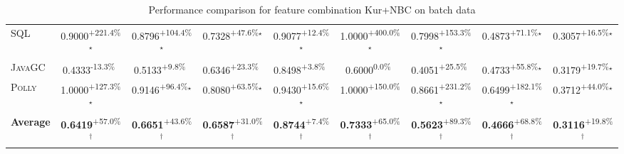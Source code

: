 \begin{table}[htbp]
\begin{tabular}{l|cccc|cccc}
\textsc{SQL} & \cellcolor{green!30}0.9000\textsuperscript{+221.4\%}$^\star$ & \cellcolor{green!30}0.8796\textsuperscript{+104.4\%}$^\star$ & \cellcolor{green!30}0.7328\textsuperscript{+47.6\%}$^\star$ & \cellcolor{green!30}0.9077\textsuperscript{+12.4\%}$^\star$ & \cellcolor{green!30}1.0000\textsuperscript{+400.0\%}$^\star$ & \cellcolor{green!30}0.7998\textsuperscript{+153.3\%}$^\star$ & \cellcolor{green!30}0.4873\textsuperscript{+71.1\%}$^\star$ & \cellcolor{green!30}0.3057\textsuperscript{+16.5\%}$^\star$ \\
\textsc{JavaGC} & \cellcolor{red!30}0.4333\textsuperscript{-13.3\%}$^{\,\,\,}$ & \cellcolor{green!30}0.5133\textsuperscript{+9.8\%}$^{\,\,\,}$ & \cellcolor{green!30}0.6346\textsuperscript{+23.3\%}$^{\,\,\,}$ & \cellcolor{green!30}0.8498\textsuperscript{+3.8\%}$^{\,\,\,}$ & \cellcolor{red!30}0.6000\textsuperscript{0.0\%}$^{\,\,\,}$ & \cellcolor{green!30}0.4051\textsuperscript{+25.5\%}$^{\,\,\,}$ & \cellcolor{green!30}0.4733\textsuperscript{+55.8\%}$^\star$ & \cellcolor{green!30}0.3179\textsuperscript{+19.7\%}$^\star$ \\
\textsc{Polly} & \cellcolor{green!30}1.0000\textsuperscript{+127.3\%}$^\star$ & \cellcolor{green!30}0.9146\textsuperscript{+96.4\%}$^\star$ & \cellcolor{green!30}0.8080\textsuperscript{+63.5\%}$^\star$ & \cellcolor{green!30}0.9430\textsuperscript{+15.6\%}$^\star$ & \cellcolor{green!30}1.0000\textsuperscript{+150.0\%}$^{\,\,\,}$ & \cellcolor{green!30}0.8661\textsuperscript{+231.2\%}$^\star$ & \cellcolor{green!30}0.6499\textsuperscript{+182.1\%}$^\star$ & \cellcolor{green!30}0.3712\textsuperscript{+44.0\%}$^\star$ \\
\hline
\textbf{Average} & \cellcolor{green!30}\textbf{0.6419}\textsuperscript{+57.0\%}$^\dagger$ & \cellcolor{green!30}\textbf{0.6651}\textsuperscript{+43.6\%}$^\dagger$ & \cellcolor{green!30}\textbf{0.6587}\textsuperscript{+31.0\%}$^\dagger$ & \cellcolor{green!30}\textbf{0.8744}\textsuperscript{+7.4\%}$^\dagger$ & \cellcolor{green!30}\textbf{0.7333}\textsuperscript{+65.0\%}$^\dagger$ & \cellcolor{green!30}\textbf{0.5623}\textsuperscript{+89.3\%}$^\dagger$ & \cellcolor{green!30}\textbf{0.4666}\textsuperscript{+68.8\%}$^\dagger$ & \cellcolor{green!30}\textbf{0.3116}\textsuperscript{+19.8\%}$^\dagger$ \\
\hline
\end{tabular}
\caption{Performance comparison for feature combination Kur+NBC on batch data}
\label{tab:combo_Kur_NBC_performance_batch}
\end{table}